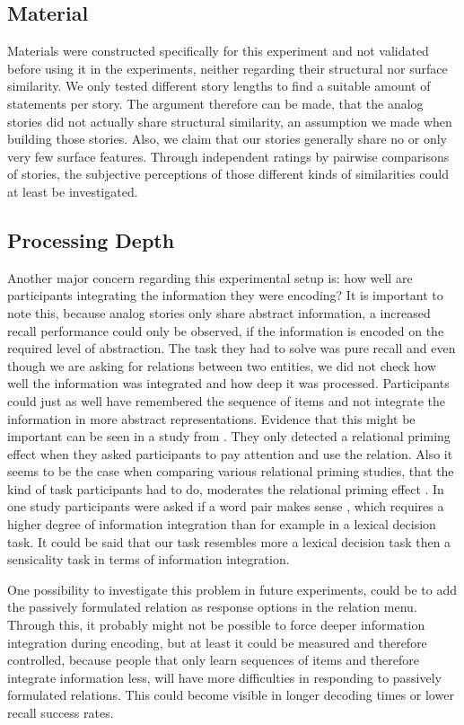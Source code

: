 \documentclass[a4paper,man,natbib,floatsintext,import]{apa6}
\begin{document}
\subsection{Material}
Materials were constructed specifically for this experiment and not validated before using it in the experiments, neither regarding their structural nor surface similarity. We only tested different story lengths to find a suitable amount of statements per story. The argument therefore can be made, that the analog stories did not actually share structural similarity, an assumption we made when building those stories. Also, we claim that our stories generally share no or only very few surface features. Through independent ratings by pairwise comparisons of stories, the subjective perceptions of those different kinds of similarities could at least be investigated.

\subsection{Processing Depth}
Another major concern regarding this experimental setup is: how well are participants integrating the information they were encoding? It is important to note this, because analog stories only share abstract information, a increased recall performance could only be observed, if the information is encoded on the required level of abstraction. The task they had to solve was pure recall and even though we are asking for relations between two entities, we did not check how well the information was integrated and how deep it was processed. Participants could just as well have remembered the sequence of items and not integrate the information in more abstract representations. Evidence that this might be important can be seen in a study from \cite{Spellman2001}. They only detected a relational priming effect when they asked participants to pay attention and use the relation. Also it seems to be the case when comparing various relational priming studies, that the kind of task participants had to do, moderates the relational priming effect \citep{Popov2015}. In one study participants were asked if a word pair makes sense \citep{Estes2006}, which requires a higher degree of information integration than for example in a lexical decision task. It could be said that our task resembles more a lexical decision task then a sensicality task in terms of information integration.

One possibility to investigate this problem in future experiments, could be to add the passively formulated relation as response options in the relation menu. Through this, it probably might not be possible to force deeper information integration during encoding, but at least it could be measured and therefore controlled, because people that only learn sequences of items and therefore integrate information less, will have more difficulties in responding to passively formulated relations. This could become visible in longer decoding times or lower recall success rates.
\end{document}

